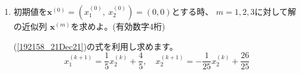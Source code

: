 \documentclass[12pt,b5paper]{ltjsarticle}
\begin{document}
\begin{enumerate}
       これにより次の式が得られます。
       \begin{equation}
        x_1^{(k+1)}=\frac{1}{5}x_2^{(k)} + \frac{4}{5}
         , \quad
         x_2^{(k+1)}=-\frac{1}{25}x_2^{(k)} +\frac{26}{25}\label{192158_21Dec21}
       \end{equation}

       \dotfill

       連立方程式を変形することでも上の式が得られます。
       \begin{equation}
        5x_1-x_2=4 \quad \longrightarrow \quad x_1=\frac{1}{5}(x_2+4)
       \end{equation}
       この変形した式の左辺を$k+1$回目の近似値$x_1^{(k+1)}$とし、
       右辺を$k$回目$x_2^{(k)}$とします。
       これにより次の式が得られます。
       \begin{equation}
        x_1^{(k+1)}=\frac{1}{5}(x_2^{(k)}+4)\label{191817_21Dec21}
       \end{equation}

       同様に二つ目の式も変形します。
       \begin{equation}
        x_1 + 5x_2 = 6 \quad \longrightarrow \quad x_2 = \frac{1}{5}(-x_1+6)
       \end{equation}
       左辺を$k+1$回目の近似値$x_2^{(k+1)}$をします。
       右辺は先ほど求めた$k+1$番目の近似値$x_1^{(k+1)}$を使います。
       (ヤコビ法では$k$番目を使います。)
       \begin{equation}
        x_2^{(k+1)} = \frac{1}{5}(-x_1^{(k+1)}+6)\label{191834_21Dec21}
       \end{equation}
       (\ref{191817_21Dec21})と(\ref{191834_21Dec21})の式を使って
       近似解を求めていきます。
       (\ref{191817_21Dec21})の式を(\ref{191834_21Dec21})に代入することで
       (\ref{192158_21Dec21})の式が得られます。

       \hrulefill
       
 \item 初期値を$\bm{x}^{(0)}=\left(x_1^{(0)}, \ x_2^{(0)}\right)=(0,0)$とする時、
       $m=1,2,3$に対して解の近似列 $\bm{x}^{(m)}$を求めよ。(有効数字4桁)

       \dotfill

       (\ref{192158_21Dec21})の式を利用し求めます。
       \begin{equation}
        x_1^{(k+1)}=\frac{1}{5}x_2^{(k)} + \frac{4}{5}
         , \quad
         x_2^{(k+1)}=-\frac{1}{25}x_2^{(k)} +\frac{26}{25}
       \end{equation}


\end{enumerate}
\end{document}
